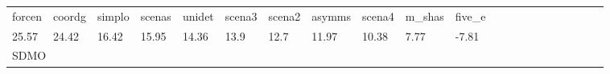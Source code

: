 \begin{table}
\begin{center}
\begin{tabular}{lllllllllllllllllllll}
    
    
    forcen
    
    
    &
    
    coordg
    
    
    &
    
    simplo
    
    
    &
    
    scenas
    
    
    &
    
    unidet
    
    
    &
    
    scena3
    
    
    &
    
    scena2
    
    
    &
    
    asymms
    
    
    &
    
    scena4
    
    
    &
    
    m_shas
    
    
    &
    
    five_e
     \\

    
    
    25.57
    
    
    &
    
    24.42
    
    
    &
    
    16.42
    
    
    &
    
    15.95
    
    
    &
    
    14.36
    
    
    &
    
    13.9
    
    
    &
    
    12.7
    
    
    &
    
    11.97
    
    
    &
    
    10.38
    
    
    &
    
    7.77
    
    
    &
    
    -7.81
     \\


\hline
\multicolumn{ 11 }{l}{ SDMO }\\ \hline



\end{tabular}
\end{center}
\end{table}
